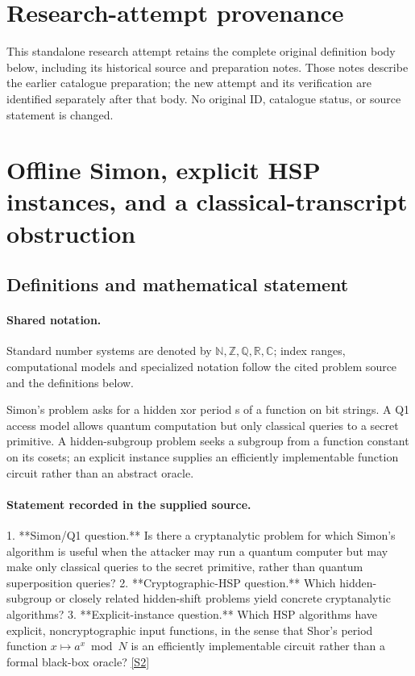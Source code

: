 \documentclass[11pt]{article}
\begin{document}
\section*{Research-attempt provenance}
This standalone research attempt retains the complete original definition body below,
including its historical source and preparation notes. Those notes describe the
earlier catalogue preparation; the new attempt and its verification are identified
separately after that body. No original ID, catalogue status, or source statement is changed.

\section{Offline Simon, explicit HSP instances, and a classical-transcript obstruction}\label{statement}

\subsection{Definitions and mathematical statement}

\paragraph{Shared notation.}Standard number systems are denoted by $\mathbb N,\mathbb Z,\mathbb Q,\mathbb R,\mathbb C$; index ranges, computational models and specialized notation follow the cited problem source and the definitions below.


Simon's problem asks for a hidden xor period s of a function on bit strings. A Q1 access model allows quantum computation but only classical queries to a secret primitive. A hidden-subgroup problem seeks a subgroup from a function constant on its cosets; an explicit instance supplies an efficiently implementable function circuit rather than an abstract oracle.
\paragraph{Statement recorded in the supplied source.}
1. **Simon/Q1 question.** Is there a cryptanalytic problem for which Simon's algorithm is useful when the attacker may run a quantum computer but may make only classical queries to the secret primitive, rather than quantum superposition queries?
2. **Cryptographic-HSP question.** Which hidden-subgroup or closely related hidden-shift problems yield concrete cryptanalytic algorithms?
3. **Explicit-instance question.** Which HSP algorithms have explicit, noncryptographic input functions, in the sense that Shor's period function \(x\mapsto a^x\bmod N\) is an efficiently implementable circuit rather than a formal black-box oracle? \href{http://aimpl.org/quantumalg/6/}{[S2]}
\end{document}
